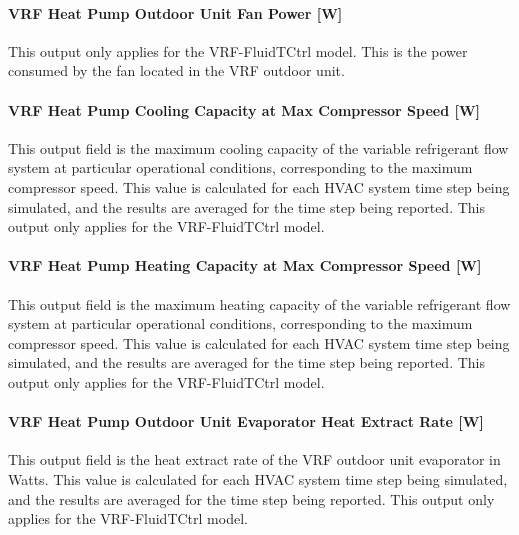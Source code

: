 \paragraph{VRF Heat Pump Outdoor Unit Fan Power {[}W{]}}\label{vrf-heat-pump-outdoor-unit-fan-power-w}

This output only applies for the VRF-FluidTCtrl model. This is the power consumed by the fan located in the VRF outdoor unit.

\paragraph{VRF Heat Pump Cooling Capacity at Max Compressor Speed {[}W{]}}\label{vrf-heat-pump-cooling-capacity-at-max-compressor-speed}

This output field is the maximum cooling capacity of the variable refrigerant flow system at particular operational conditions, corresponding to the maximum compressor speed. This value is calculated for each HVAC system time step being simulated, and the results are averaged for the time step being reported. This output only applies for the VRF-FluidTCtrl model.

\paragraph{VRF Heat Pump Heating Capacity at Max Compressor Speed {[}W{]}}\label{vrf-heat-pump-heating-capacity-at-max-compressor-speed}

This output field is the maximum heating capacity of the variable refrigerant flow system at particular operational conditions, corresponding to the maximum compressor speed. This value is calculated for each HVAC system time step being simulated, and the results are averaged for the time step being reported. This output only applies for the VRF-FluidTCtrl model.

\paragraph{VRF Heat Pump Outdoor Unit Evaporator Heat Extract Rate {[}W{]}}\label{vrf-heat-pump-outdoor-unit-evaporator-heat-extract-rate}

This output field is the heat extract rate of the VRF outdoor unit evaporator in Watts. This value is calculated for each HVAC system time step being simulated, and the results are averaged for the time step being reported. This output only applies for the VRF-FluidTCtrl model.

